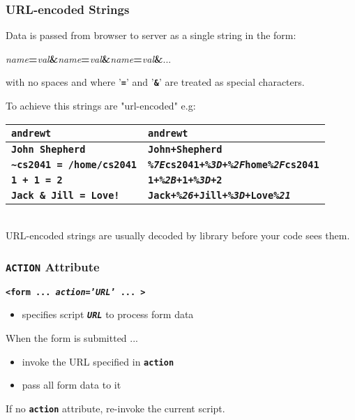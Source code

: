 \begin{frame}[fragile]
\frametitle{URL-encoded Strings}
Data is passed from browser to server as a single string in the form:

{\it{name}}{\bf{=}}{\it{val}}{\bf{\&}}{\it{name}}{\bf{=}}{\it{val}}{\bf{\&}}{\it{name}}{\bf{=}}{\it{val}}{\bf{\&}}...

with no spaces and where '\textbf{\tt{{\bf{=}}}}' and '\textbf{\tt{{\bf{\&}}}}'
are treated as special characters.

To achieve this strings are "url-encoded" e.g: \\[2ex]

\begin{tabular}{|l|l|}
\hline
\textbf{\tt{andrewt}} & \textbf{\tt{andrewt}} \\
\hline
\textbf{\tt{John Shepherd}}  &  \textbf{\tt{John{\em{+}}Shepherd}}  \\
\hline
\textbf{\tt{{\textasciitilde}cs2041 = /home/cs2041}}  & \textbf{\tt{{\em{\%7E}}cs2041{\em{+}}{\em{\%3D}}{\em{+}}{\em{\%2F}}home{\em{\%2F}}cs2041}}  \\
\hline
\textbf{\tt{1 + 1 = 2}}  & \textbf{\tt{1{\em{+}}{\em{\%2B}}{\em{+}}1{\em{+}}{\em{\%3D}}{\em{+}}2}}  \\
\hline
\textbf{\tt{Jack \& Jill = Love!}}  & \textbf{\tt{Jack{\em{+}}{\em{\%26}}{\em{+}}Jill{\em{+}}{\em{\%3D}}{\em{+}}Love{\em{\%21}} }}  \\
\hline
\end{tabular}
 \\[2ex]
URL-encoded strings are usually decoded by library before your code sees them.
\end{frame}

\begin{frame}
\frametitle{\textbf{\tt{ACTION}} Attribute}
\textbf{\tt{{\textless}form ... {\em{{\bf{action}}}}='{\it{URL}}' ... >}}
\begin{itemize}
\item  specifies script \textbf{\tt{{\it{URL}}}} to process form data
\end{itemize}
When the form is submitted ...
\begin{itemize}
\item  invoke the URL specified in \textbf{\tt{action}}
\item  pass all form data to it
\end{itemize}
If no \textbf{\tt{action}} attribute, re-invoke the current script.
\end{frame}

